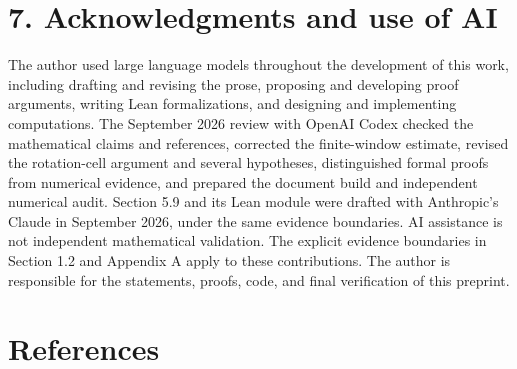 \documentclass[12pt]{article}
\begin{document}
\section{7. Acknowledgments and use of
AI}\label{acknowledgments-and-use-of-ai}

The author used large language models throughout the development of this
work, including drafting and revising the prose, proposing and
developing proof arguments, writing Lean formalizations, and designing
and implementing computations. The September 2026 review with OpenAI
Codex checked the mathematical claims and references, corrected the
finite-window estimate, revised the rotation-cell argument and several
hypotheses, distinguished formal proofs from numerical evidence, and
prepared the document build and independent numerical audit. Section 5.9
and its Lean module were drafted with Anthropic's Claude in September
2026, under the same evidence boundaries. AI assistance is not
independent mathematical validation. The explicit evidence boundaries in
Section 1.2 and Appendix A apply to these contributions. The author is
responsible for the statements, proofs, code, and final verification of
this preprint.

\section{References}\label{references}

\begingroup\small
\end{document}
